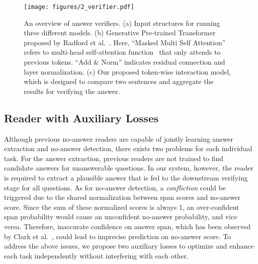 \documentclass[letterpaper]{article} \usepackage{aaai19}  \usepackage{times}  \usepackage{helvet}  \usepackage{courier}  \usepackage{url}  \usepackage{graphicx}  \usepackage{pbox}
\begin{document}
\begin{figure*}
\begin{center}
\texttt{[image: figures/2\_verifier.pdf]}
\vspace{-0.1cm}
\caption{An overview of answer verifiers. 
(a) Input structures for running three different models.
(b) Generative Pre-trained Transformer proposed by Radford et al.~. Here, ``Masked Multi Self Attention'' refers to multi-head self-attention function~\cite{vaswani2017attention} that only attends to previous tokens. ``Add \& Norm'' indicates residual connection and layer normalization.
(c) Our proposed token-wise interaction model, which is designed to compare two sentences and aggregate the results for verifying the answer.
}
\label{fig2}
\vspace{-0.5cm}
\end{center}
\end{figure*}

\subsection{Reader with Auxiliary Losses}
Although previous no-answer readers are capable of jointly learning answer extraction and no-answer detection, there exists two problems for each individual task.
For the answer extraction, previous readers are not trained to find candidate answers for unanswerable questions.
In our system, however, the reader is required to extract a plausible answer that is fed to the downstream verifying stage for all questions.
As for no-answer detection, a \emph{confliction} could be triggered due to the shared normalization between span scores and no-answer score.
Since the sum of these normalized scores is always 1, an over-confident span probability would cause an unconfident no-answer probability, and vice versa.
Therefore, inaccurate confidence on answer span, which has been observed by Clark et al.~, could lead to imprecise prediction on no-answer score.
To address the above issues, we propose two auxiliary losses to optimize and enhance each task independently without interfering with each other.
\end{document}
